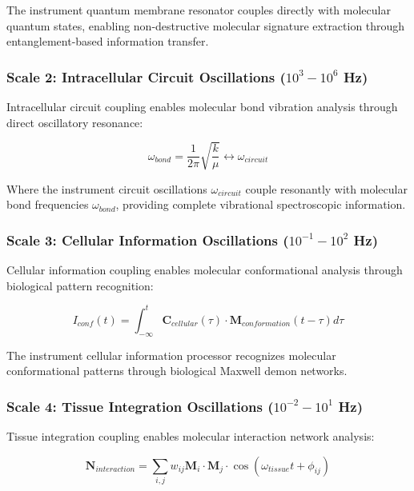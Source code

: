 \documentclass[12pt,a4paper]{article}
\begin{document}
The instrument quantum membrane resonator couples directly with molecular quantum states, enabling non-destructive molecular signature extraction through entanglement-based information transfer.

\subsubsection{Scale 2: Intracellular Circuit Oscillations ($10^3-10^6$ Hz)}

Intracellular circuit coupling enables molecular bond vibration analysis through direct oscillatory resonance:

\begin{equation}
\omega_{bond} = \frac{1}{2\pi}\sqrt{\frac{k}{\mu}} \leftrightarrow \omega_{circuit}
\end{equation}

Where the instrument circuit oscillations $\omega_{circuit}$ couple resonantly with molecular bond frequencies $\omega_{bond}$, providing complete vibrational spectroscopic information.

\subsubsection{Scale 3: Cellular Information Oscillations ($10^{-1}-10^2$ Hz)}

Cellular information coupling enables molecular conformational analysis through biological pattern recognition:

\begin{equation}
I_{conf}(t) = \int_{-\infty}^{t} \mathbf{C}_{cellular}(\tau) \cdot \mathbf{M}_{conformation}(t-\tau) d\tau
\end{equation}

The instrument cellular information processor recognizes molecular conformational patterns through biological Maxwell demon networks.

\subsubsection{Scale 4: Tissue Integration Oscillations ($10^{-2}-10^1$ Hz)}

Tissue integration coupling enables molecular interaction network analysis:

\begin{equation}
\mathbf{N}_{interaction} = \sum_{i,j} w_{ij} \mathbf{M}_i \cdot \mathbf{M}_j \cdot \cos(\omega_{tissue}t + \phi_{ij})
\end{equation}
\end{document}
